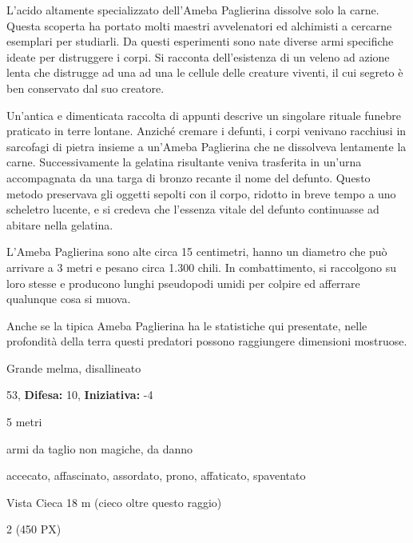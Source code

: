 \begin{multicols}{2}
{L'acido altamente specializzato dell'Ameba Paglierina dissolve solo la carne. Questa scoperta ha portato molti maestri avvelenatori ed alchimisti a cercarne esemplari per studiarli. Da questi esperimenti sono nate diverse armi specifiche ideate per distruggere i corpi. Si racconta dell'esistenza di un veleno ad azione lenta che distrugge ad una ad una le cellule delle creature viventi, il cui segreto è ben conservato dal suo creatore.

Un'antica e dimenticata raccolta di appunti descrive un singolare rituale funebre praticato in terre lontane. Anziché cremare i defunti, i corpi venivano racchiusi in sarcofagi di pietra insieme a un'Ameba Paglierina che ne dissolveva lentamente la carne. Successivamente la gelatina risultante veniva trasferita in un'urna accompagnata da una targa di bronzo recante il nome del defunto. Questo metodo preservava gli oggetti sepolti con il corpo, ridotto in breve tempo a uno scheletro lucente, e si credeva che l'essenza vitale del defunto continuasse ad abitare nella gelatina.

L'Ameba Paglierina sono alte circa 15 centimetri, hanno un diametro che può arrivare a 3 metri e pesano circa 1.300 chili. In combattimento, si raccolgono su loro stesse e producono lunghi pseudopodi umidi per colpire ed afferrare qualunque cosa si muova.

Anche se la tipica Ameba Paglierina ha le statistiche qui presentate, nelle profondità della terra questi predatori possono raggiungere dimensioni mostruose.


\noindent
\begin{description}[noitemsep, topsep=0pt, parsep=0pt, partopsep=0pt, leftmargin=0cm, labelwidth=2.2cm]
	\item[\textbf{Taglia/Tipo:}] Grande melma, disallineato
	\item[\textbf{Caratt.:}] 
	\item[\textbf{Punti Ferita:}] 53,  \textbf{Difesa:} 10,  \textbf{Iniziativa:} -4
	\item[\textbf{Movimento:}] 5 metri
	\item[\textbf{Tiri Salvez.:}] 
	\item[\textbf{Imm. Danni:}] armi da taglio non magiche, da danno
	\item[\textbf{Immunità:}] accecato, affascinato, assordato, prono, affaticato, spaventato
	\item[\textbf{Sensi:}] Vista Cieca 18 m (cieco oltre questo raggio)
	\item[\textbf{Sfida:}] 2 (450 PX)\smallskip
\end{description}

}
\end{multicols}
